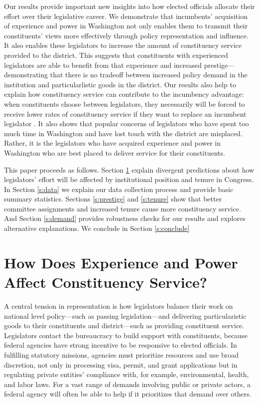 \documentclass{article}
\begin{document}
Our results provide important new insights into how elected officials allocate their effort over their legislative career.  We demonstrate that incumbents' acquisition of experience and power in Washington not only enables them to transmit their constituents' views more effectively through policy representation and influence.  It also enables these legislators to increase the amount of constituency service provided to the district.  This suggests that constituents with experienced legislators are able to benefit from that experience and increased prestige---demonstrating that there is no tradeoff between increased policy demand in the institution and particularlistic goods in the district.  Our results also help to explain how constituency service can contribute to the incumbency advantage: when constituents choose between legislators, they necessarily will be forced to receive lower rates of constituency service if they want to replace an incumbent legislator .  It also shows that popular concerns of legislators who have spent too much time in Washington and have lost touch with the district are misplaced.  Rather, it is the legislators who have acquired experience and power in Washington who are best placed to deliver service for their constituents.    

This paper proceeds as follows.  Section \ref{s:theory} explain divergent predictions about how legislators' effort will be affected by institutional position and tenure in Congress.  In Section \ref{s:data} we explain our data collection process and provide basic summary statistics.  Sections \ref{s:prestige} and \ref{s:tenure} show that better committee assignments and increased tenure cause more constituency service.  And Section \ref{s:demand} provides robustness checks for our results and explores alternative explanations.  We conclude in Section \ref{s:conclude}


\section{How Does Experience and Power Affect Constituency Service?} \label{s:theory}

A central tension in representation is how legislators balance their work on national level policy---such as passing legislation---and delivering particularistic goods to their constituents and district---such as providing constituent service.  Legislators contact the bureaucracy to build support with constituents, because federal agencies have strong incentive to be responsive to elected officials. In fulfilling statutory missions, agencies must prioritize resources and use broad discretion, not only in processing visa, permit, and grant applications but in regulating private entities' compliance with, for example, environmental, health, and labor laws. For a vast range of demands involving public or private actors, a federal agency will often be able to help if it prioritizes that demand over others. 
\end{document}
